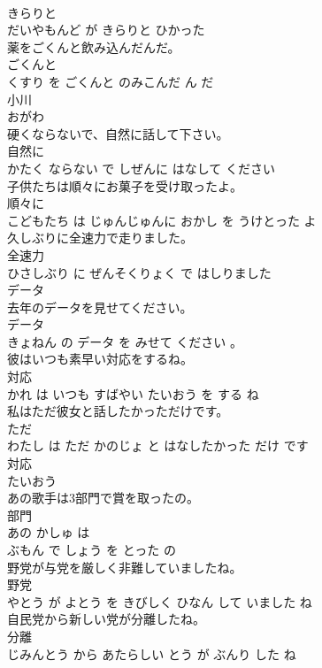 \documentclass[8pt]{extreport}
\begin{document}
\begin{CJK}{UTF8}{min}
\\	きらりと 
\\	だいやもんど が きらりと ひかった			
\\	薬をごくんと飲み込んだんだ。	
\\	ごくんと 
\\	くすり を ごくんと のみこんだ ん だ			
\\	小川	
\\	おがわ			
\\	硬くならないで、自然に話して下さい。	
\\	自然に 
\\	かたく ならない で しぜんに はなして ください			
\\	子供たちは順々にお菓子を受け取ったよ。	
\\	順々に 
\\	こどもたち は じゅんじゅんに おかし を うけとった よ			
\\	久しぶりに全速力で走りました。	
\\	全速力 
\\	ひさしぶり に ぜんそくりょく で はしりました			
\\	データ	
\\	去年のデータを見せてください。	
\\	データ 
\\	きょねん の データ を みせて ください 。			
\\	彼はいつも素早い対応をするね。	
\\	対応 
\\	かれ は いつも すばやい たいおう を する ね			
\\	私はただ彼女と話したかっただけです。	
\\	ただ 
\\	わたし は ただ かのじょ と はなしたかった だけ です			
\\	対応	
\\	たいおう			
\\	あの歌手は3部門で賞を取ったの。	
\\	部門 
\\	あの かしゅ は 
\\	ぶもん で しょう を とった の			
\\	野党が与党を厳しく非難していましたね。	
\\	野党 
\\	やとう が よとう を きびしく ひなん して いました ね			
\\	自民党から新しい党が分離したね。	
\\	分離 
\\	じみんとう から あたらしい とう が ぶんり した ね			

\end{CJK}
\end{document}

